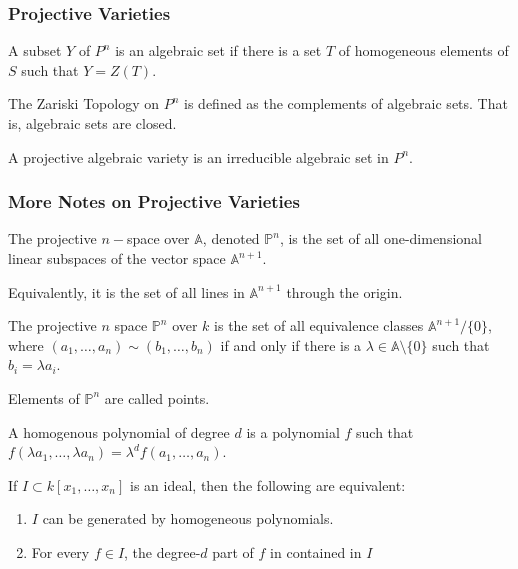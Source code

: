 \documentclass[crop=false,class=book]{standalone}
\begin{document}
\subsubsection{Projective Varieties}
\begin{definition}
A subset $Y$ of $P^n$ is an algebraic set if there is a set $T$ of homogeneous elements of $S$ such that $Y=Z(T)$.
\end{definition}
\begin{definition}
The Zariski Topology on $P^n$ is defined as the complements of algebraic sets. That is, algebraic sets are closed.
\end{definition}
\begin{definition}
A projective algebraic variety is an irreducible algebraic set in $P^n$.
\end{definition}
\subsubsection{More Notes on Projective Varieties}
\begin{definition}
The projective $n-$space over $\mathbb{A}$, denoted $\mathbb{P}^n$, is the set of all one-dimensional linear subspaces of the vector space $\mathbb{A}^{n+1}$.
\end{definition}
\begin{remark}
Equivalently, it is the set of all lines in $\mathbb{A}^{n+1}$ through the origin.
\end{remark}
\begin{definition}
The projective $n$ space $\mathbb{P}^{n}$ over $k$ is the set of all equivalence classes $\mathbb{A}^{n+1}/\{0\}$, where $(a_1,\hdots, a_n)\sim (b_1,\hdots, b_n)$ if and only if there is a $\lambda\in\mathbb{A}\setminus\{0\}$ such that $b_{i}=\lambda a_{i}$.
\end{definition}
\begin{remark}
Elements of $\mathbb{P}^{n}$ are called points.
\end{remark}
\begin{definition}
A homogenous polynomial of degree $d$ is a polynomial $f$ such that $f(\lambda a_1,\hdots, \lambda a_n) = \lambda^d f(a_1,\hdots, a_n)$.
\end{definition}
\begin{theorem}
If $I\subset k[x_1,\hdots ,x_n]$ is an ideal, then the following are equivalent:
\begin{enumerate}
    \item $I$ can be generated by homogeneous polynomials.
    \item For every $f\in I$, the degree-$d$ part of $f$ in contained in $I$
\end{enumerate}
\end{theorem}
\end{document}

